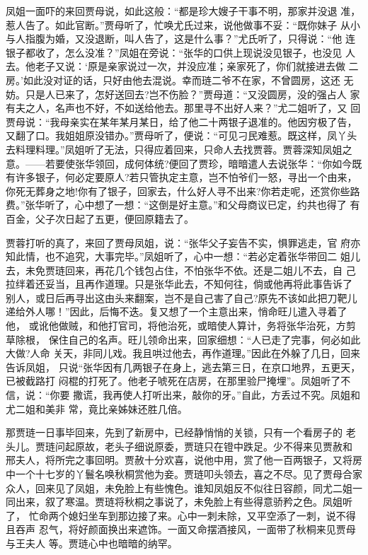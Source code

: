 凤姐一面吓的来回贾母说，如此这般：“都是珍大嫂子干事不明，那家并没退
准，惹人告了。如此官断。”贾母听了，忙唤尤氏过来，说他做事不妥：“既你妹子
从小与人指腹为婚，又没退断，叫人告了，这是什么事？”尤氏听了，只得说：“他
连银子都收了，怎么没准？”凤姐在旁说：“张华的口供上现说没见银子，也没见
人去。他老子又说：‘原是亲家说过一次，并没应准；亲家死了，你们就接进去做
二房。’如此没对证的话，只好由他去混说。幸而琏二爷不在家，不曾圆房，这还
无妨。只是人已来了，怎好送回去?岂不伤脸？”贾母道：“又没圆房，没的强占人
家有夫之人，名声也不好，不如送给他去。那里寻不出好人来？”尤二姐听了，又
回贾母说：“我母亲实在某年某月某日，给了他二十两银子退准的。他因穷极了告，
又翻了口。我姐姐原没错办。”贾母听了，便说：“可见刁民难惹。既这样，凤丫头
去料理料理。”凤姐听了无法，只得应着回来，只命人去找贾蓉。贾蓉深知凤姐之
意。——若要使张华领回，成何体统?便回了贾珍，暗暗遣人去说张华：“你如今既
有许多银子，何必定要原人?若只管执定主意，岂不怕爷们一怒，寻出一个由来，
你死无葬身之地!你有了银子，回家去，什么好人寻不出来?你若走呢，还赏你些路
费。”张华听了，心中想了一想：“这倒是好主意。”和父母商议已定，约共也得了
有百金，父子次日起了五更，便回原籍去了。

贾蓉打听的真了，来回了贾母凤姐，说：“张华父子妄告不实，惧罪逃走，官
府亦知此情，也不追究，大事完毕。”凤姐听了，心中一想：“若必定着张华带回二
姐儿去，未免贾琏回来，再花几个钱包占住，不怕张华不依。还是二姐儿不去，自
己拉绊着还妥当，且再作道理。只是张华此去，不知何往，倘或他再将此事告诉了
别人，或日后再寻出这由头来翻案，岂不是自己害了自己?原先不该如此把刀靶儿
递给外人哪！”因此，后悔不迭。复又想了一个主意出来，悄命旺儿遣入寻着了他，
或讹他做贼，和他打官司，将他治死，或暗使人算计，务将张华治死，方剪草除根，
保住自己的名声。旺儿领命出来，回家细想：“人已走了完事，何必如此大做?人命
关天，非同儿戏。我且哄过他去，再作道理。”因此在外躲了几日，回来告诉凤姐，
只说“张华因有几两银子在身上，逃去第三日，在京口地界，五更天，已被截路打
闷棍的打死了。他老子唬死在店房，在那里验尸掩埋”。凤姐听了不信，说：“你要
撒谎，我再使人打听出来，敲你的牙。”自此，方丢过不究。凤姐和尤二姐和美非
常，竟比亲姊妹还胜几倍。

那贾琏一日事毕回来，先到了新房中，已经静悄悄的关锁，只有一个看房子的
老头儿。贾琏问起原故，老头子细说原委，贾琏只在镫中跌足。少不得来见贾赦和
邢夫人，将所完之事回明。贾赦十分欢喜，说他中用，赏了他一百两银子，又将房
中一个十七岁的丫鬟名唤秋桐赏他为妾。贾琏叩头领去，喜之不尽。见了贾母合家
众人，回来见了凤姐，未免脸上有些愧色。谁知凤姐反不似往日容颜，同尤二姐一
同出来，叙了寒温。贾琏将秋桐之事说了，未免脸上有些得意骄矜之色。凤姐听了，
忙命两个媳妇坐车到那边接了来。心中一刺未除，又平空添了一刺，说不得且吞声
忍气，将好颜面换出来遮饰。一面又命摆酒接风，一面带了秋桐来见贾母与王夫人
等。贾琏心中也暗暗的纳罕。

